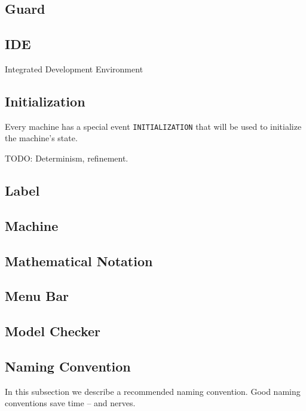 \subsection{Guard}
\label{guard}

\subsection{IDE}
\label{ide}

Integrated Development Environment

\subsection{Initialization}
\label{initialization}

Every machine has a special event \texttt{INITIALIZATION} that will be used to initialize the machine's state.

TODO: Determinism, refinement.

\subsection{Label}
\label{label}

\subsection{Machine}
\label{machine}

\subsection{Mathematical Notation}
\label{mathematical_notation}

\subsection{Menu Bar}
\label{menu_bar}

\subsection{Model Checker}
\label{model_checker}

\subsection{Naming Convention}
\label{naming_convention}

In this subsection we describe a recommended naming convention.  Good naming conventions save time -- and nerves.

